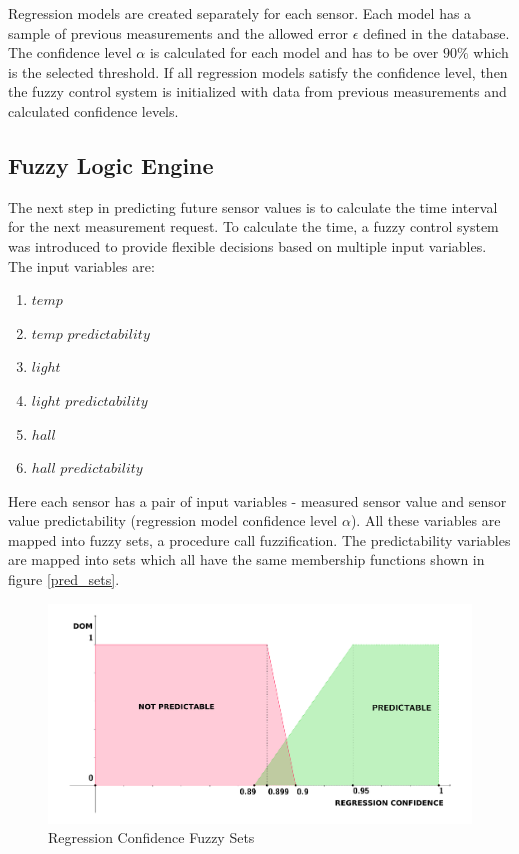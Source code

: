 Regression models are created separately for each sensor. Each model has a sample of previous measurements and the allowed error $\epsilon$ defined in the database. 
The confidence level $\alpha$ is calculated for each model and has to be over $90\%$ which is the selected threshold. If all regression models satisfy the confidence level, then the fuzzy control system is initialized with data from previous measurements and calculated confidence levels. 

\subsection{Fuzzy Logic Engine}

The next step in predicting future sensor values is to calculate the time interval for the next measurement request. To calculate the time, a fuzzy control system was introduced to provide flexible decisions based on multiple input variables. The input variables are: 
\begin{enumerate}
\item $temp$					
\item $temp$ $predictability$	
\item $light$					
\item $light$ $predictability$	
\item $hall$					
\item $hall$ $predictability$
\end{enumerate}

Here each sensor has a pair of input variables - measured sensor value and sensor value predictability (regression model confidence level $\alpha$). All these variables are mapped into fuzzy sets, a procedure call fuzzification. The predictability variables are mapped into sets which all have the same membership functions shown in figure \autoref{pred_sets}.

\begin{figure}[h!]
\centering
\includegraphics[scale=0.58]{4/figures/pred_sets.pdf}
\caption{Regression Confidence Fuzzy Sets}
\label{pred_sets}
\end{figure}

